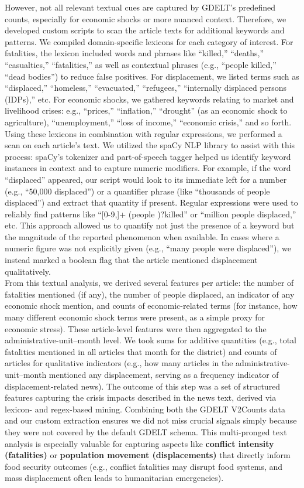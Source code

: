 \documentclass{article}
\begin{document}
However, not all relevant textual cues are captured by GDELT’s predefined counts, especially for economic shocks or more nuanced context. Therefore, we developed custom scripts to scan the article texts for additional keywords and patterns. We compiled domain-specific lexicons for each category of interest. For fatalities, the lexicon included words and phrases like “killed,” “deaths,” “casualties,” “fatalities,” as well as contextual phrases (e.g., “people killed,” “dead bodies”) to reduce false positives. For displacement, we listed terms such as “displaced,” “homeless,” “evacuated,” “refugees,” “internally displaced persons (IDPs),” etc. For economic shocks, we gathered keywords relating to market and livelihood crises: e.g., “prices,” “inflation,” “drought” (as an economic shock to agriculture), “unemployment,” “loss of income,” “economic crisis,” and so forth. Using these lexicons in combination with regular expressions, we performed a scan on each article’s text. We utilized the spaCy NLP library to assist with this process: spaCy’s tokenizer and part-of-speech tagger helped us identify keyword instances in context and to capture numeric modifiers. For example, if the word “displaced” appeared, our script would look to its immediate left for a number (e.g., “50{,}000 displaced”) or a quantifier phrase (like “thousands of people displaced”) and extract that quantity if present. Regular expressions were used to reliably find patterns like “[0-9,]+ (people )?killed” or “million people displaced,” etc. This approach allowed us to quantify not just the presence of a keyword but the magnitude of the reported phenomenon when available. In cases where a numeric figure was not explicitly given (e.g., “many people were displaced”), we instead marked a boolean flag that the article mentioned displacement qualitatively.\\

From this textual analysis, we derived several features per article: the number of fatalities mentioned (if any), the number of people displaced, an indicator of any economic shock mention, and counts of economic-related terms (for instance, how many different economic shock terms were present, as a simple proxy for economic stress). These article-level features were then aggregated to the administrative-unit–month level. We took sums for additive quantities (e.g., total fatalities mentioned in all articles that month for the district) and counts of articles for qualitative indicators (e.g., how many articles in the administrative-unit–month mentioned any displacement, serving as a frequency indicator of displacement-related news). The outcome of this step was a set of structured features capturing the crisis impacts described in the news text, derived via lexicon- and regex-based mining. Combining both the GDELT V2Counts data and our custom extraction ensures we did not miss crucial signals simply because they were not covered by the default GDELT schema. This multi-pronged text analysis is especially valuable for capturing aspects like \textbf{conflict intensity (fatalities)} or \textbf{population movement (displacements)} that directly inform food security outcomes (e.g., conflict fatalities may disrupt food systems, and mass displacement often leads to humanitarian emergencies).
\end{document}
